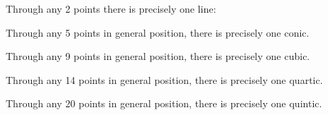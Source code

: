 \begin{example}
Through any 2 points there is precisely one line: 
\end{example}
\begin{example}
Through any 5 points in general position, there is precisely one conic.
\end{example}
\begin{example}
Through any 9 points in general position, there is precisely one cubic.
\end{example}
\begin{example}
Through any 14 points in general position, there is precisely one quartic.
\end{example}
\begin{example}
Through any 20 points in general position, there is precisely one quintic.
\end{example}

